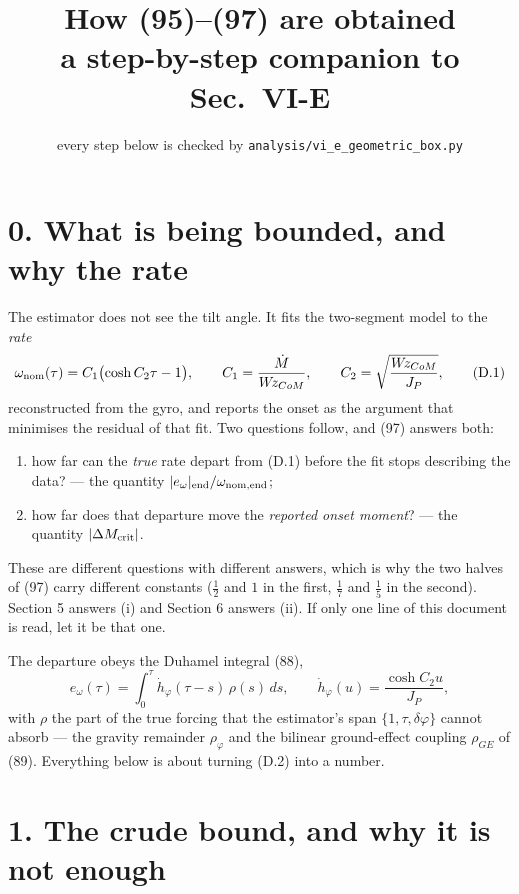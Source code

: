 \documentclass[11pt]{article}
\title{\vspace{-18mm}\textbf{How (95)--(97) are obtained}\\[2mm]
\large a step-by-step companion to Sec.~VI-E}
\date{\small every step below is checked by
\texttt{analysis/vi\_e\_geometric\_box.py}}
\newcommand{\Wz}{W\!z_{CoM}}
\begin{document}
\maketitle

\section*{0. What is being bounded, and why the rate}

The estimator does not see the tilt angle. It fits the two-segment
model to the \emph{rate}
\begin{equation}
  \omega_{\rm nom}(\tau) = C_1\bigl(\cosh C_2\tau - 1\bigr),
  \qquad C_1 = \frac{\dot M}{\Wz},
  \qquad C_2 = \sqrt{\frac{\Wz}{J_P}},
  \tag{D.1}
\end{equation}
reconstructed from the gyro, and reports the onset as the argument
that minimises the residual of that fit. Two questions follow, and
(97) answers both:

\begin{enumerate}
\item[(i)] how far can the \emph{true} rate depart from (D.1) before
  the fit stops describing the data? --- the quantity
  $|e_\omega|_{\rm end}/\omega_{\rm nom,end}$;
\item[(ii)] how far does that departure move the \emph{reported
  onset moment}? --- the quantity $|\Delta M_{\rm crit}|$.
\end{enumerate}

These are different questions with different answers, which is why the
two halves of (97) carry different constants ($\tfrac12$ and $1$ in the
first, $\tfrac17$ and $\tfrac15$ in the second). Section 5 answers (i)
and Section 6 answers (ii). If only one line of this document is read,
let it be that one.

The departure obeys the Duhamel integral (88),
\begin{equation}
  e_\omega(\tau) = \int_0^{\tau}\dot h_\varphi(\tau-s)\,\rho(s)\,ds ,
  \qquad
  \dot h_\varphi(u) = \frac{\cosh C_2 u}{J_P},
  \tag{D.2}
\end{equation}
with $\rho$ the part of the true forcing that the estimator's span
$\{1,\tau,\delta\varphi\}$ cannot absorb --- the gravity remainder
$\rho_\varphi$ and the bilinear ground-effect coupling $\rho_{GE}$ of
(89). Everything below is about turning (D.2) into a number.

\section*{1. The crude bound, and why it is not enough}
\end{document}

